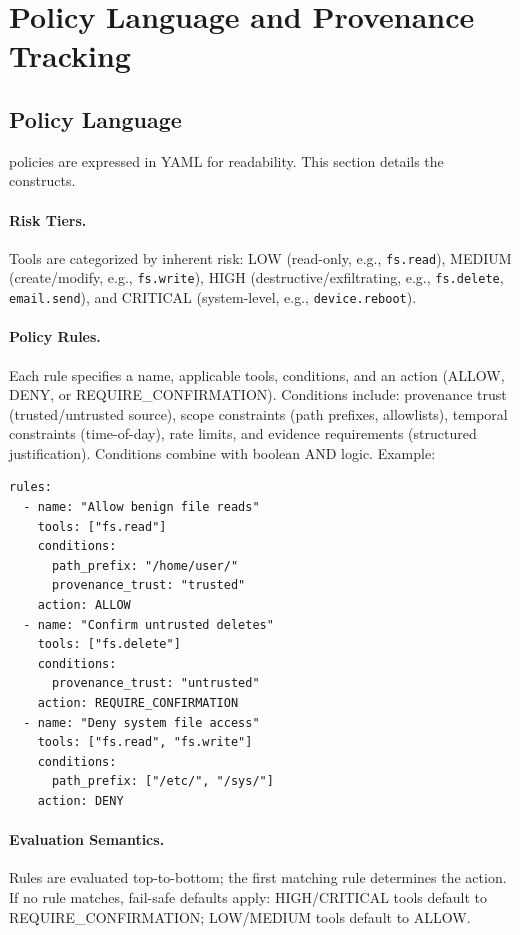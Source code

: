 \section{Policy Language and Provenance Tracking}
\label{sec:policies}

\subsection{Policy Language}

\sys{} policies are expressed in YAML for readability. This section details the constructs.

\paragraph{Risk Tiers.}
Tools are categorized by inherent risk: LOW (read-only, e.g., \texttt{fs.read}), MEDIUM (create/modify, e.g., \texttt{fs.write}), HIGH (destructive/exfiltrating, e.g., \texttt{fs.delete}, \texttt{email.send}), and CRITICAL (system-level, e.g., \texttt{device.reboot}).

\paragraph{Policy Rules.}
Each rule specifies a name, applicable tools, conditions, and an action (ALLOW, DENY, or REQUIRE\_CONFIRMATION). Conditions include: provenance trust (trusted/untrusted source), scope constraints (path prefixes, allowlists), temporal constraints (time-of-day), rate limits, and evidence requirements (structured justification). Conditions combine with boolean AND logic. Example:

\begin{verbatim}
rules:
  - name: "Allow benign file reads"
    tools: ["fs.read"]
    conditions:
      path_prefix: "/home/user/"
      provenance_trust: "trusted"
    action: ALLOW
  - name: "Confirm untrusted deletes"
    tools: ["fs.delete"]
    conditions:
      provenance_trust: "untrusted"
    action: REQUIRE_CONFIRMATION
  - name: "Deny system file access"
    tools: ["fs.read", "fs.write"]
    conditions:
      path_prefix: ["/etc/", "/sys/"]
    action: DENY
\end{verbatim}

\paragraph{Evaluation Semantics.}
Rules are evaluated top-to-bottom; the first matching rule determines the action. If no rule matches, fail-safe defaults apply: HIGH/CRITICAL tools default to REQUIRE\_CONFIRMATION; LOW/MEDIUM tools default to ALLOW.

